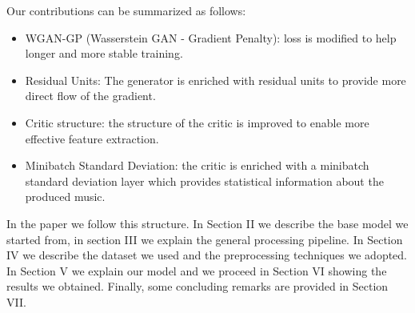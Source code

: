 Our contributions can be summarized as follows:
\begin{itemize}
    \item WGAN-GP (Wasserstein GAN - Gradient Penalty): loss is modified to help longer and more stable training.
    \item Residual Units: The generator is enriched with residual units to provide more direct flow of the gradient.
    \item Critic structure: the structure of the critic is improved to enable more effective feature extraction.
    \item Minibatch Standard Deviation: the critic is enriched with a minibatch standard deviation layer which provides statistical information about the produced music.
\end{itemize}

In the paper we follow this structure.
In Section II we describe the base model we started from, in section III we explain the general processing pipeline.
In Section IV we describe the dataset we used and the preprocessing techniques we adopted.
In Section V we explain our model and we proceed in Section VI showing the results we obtained.
Finally, some concluding remarks are provided in Section VII.
